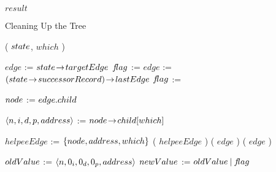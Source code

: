 \begin{limitscope}
\begin{algorithm}[htp]
{{			
			
	 }
	
	  \BlankLine
		\Return $result$\;
		



}

\caption{Cleaning Up the Tree}
\label{algo:icdcn-cleanup}
\end{algorithm}





\begin{algorithm}[htp]
\DefineKeyWords
\DontPrintSemicolon
\Boolean \MarkChildEdge( $state$, $which$ )\;
\PrintSemicolon
\Begin
{

	 {
	    $edge$ := $state \!\rightarrow\! targetEdge$\; 
	    $\flag$ := \DELETEFLAG\;
	 }
	 \Else
	 {
	    $edge$ := $( state \!\rightarrow\! successorRecord ) \!\rightarrow\! lastEdge$\; 
	    $\flag$ := \PROMOTEFLAG\;
	 }
	 
	 
   $node$ := $edge.child$\;
	
   \BlankLine
  
	 \While{\True}
	 {
	    $\langle n, i, d, p, address \rangle$ := $node \!\rightarrow\! child[which]$\;
			
			\uIf{$\iFlag$}
			{
			   $helpeeEdge$ := $\{  node, address, which  \}$\;
				 \HelpTargetNode( $helpeeEdge$ )\;
				 \Continue\;
			}
			\uElseIf{$\dFlag$}
			{
			   \uIf{$\flag$ = \PROMOTEFLAG}
				 {
						\HelpTargetNode( $edge$ )\;
						\Return \False\;
				 } 
				 \lElse
				 {
				    \Return \True
				 }
			}
			\ElseIf{$\pFlag$}
			{
			   \uIf{$\flag$ = \DELETEFLAG}
				 {
						\HelpSuccessorNode( $edge$ )\;
						\Return \False\;
				 } 
				 \lElse
				 {
				    \Return \True
				 }
			}
			
			$oldValue$ := $\langle  n, 0_i, 0_d, 0_p, address  \rangle$\;
			$newValue$ := $oldValue \: | \: f\!lag$\;
			
			
}}
\end{algorithm}
\end{limitscope}
